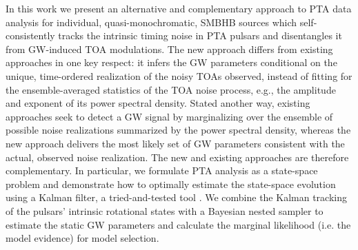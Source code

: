 \documentclass[fleqn,usenatbib,useAMS]{mnras}
\begin{document}
In this work we present an alternative and complementary approach to PTA data analysis for individual, quasi-monochromatic, SMBHB sources which self-consistently tracks the intrinsic timing noise in PTA pulsars and disentangles it from GW-induced TOA modulations. The new approach differs from existing approaches in one key respect: it infers the GW parameters conditional on the unique, time-ordered realization of the noisy TOAs observed, instead of fitting for the ensemble-averaged statistics of the TOA noise process, e.g., the amplitude and exponent of its power spectral density. Stated another way, existing approaches seek to detect a GW signal by marginalizing over the ensemble of possible noise realizations summarized by the power spectral density, whereas the new approach delivers the most likely set of GW parameters consistent with the actual, observed noise realization. The new and existing approaches are therefore complementary. In particular, we formulate PTA analysis as a state-space problem and demonstrate how to optimally estimate the state-space evolution using a Kalman filter, a tried-and-tested tool \citep{Kalman1,Meyers2021,Melatos2023}. We combine the Kalman tracking of the pulsars' intrinsic rotational states with a Bayesian nested sampler \citep{Skilling, Ashton2022} to estimate the static GW parameters and calculate the marginal likelihood (i.e. the model evidence) for model selection. \newline 
\end{document}
